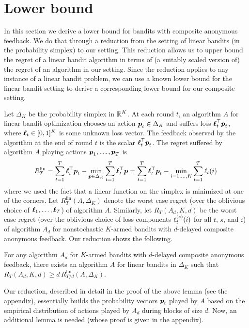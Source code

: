 \newcommand{\Rlin}{R^{\mathrm{lin}}}
\section{Lower bound}
\label{s:lower}
In this section we derive a lower bound for bandits with composite anonymous feedback. We do that through a reduction from the setting of linear bandits (in the probability simplex) to our setting. This reduction allows us to upper bound the regret of a linear bandit algorithm in terms of (a suitably scaled version of) the regret of an algorithm in our setting. Since the reduction applies to any instance of a linear bandit problem, we can use a known lower bound for the linear bandit setting to derive a corresponding lower bound for our composite setting.

Let $\Delta_K$ be the probability simplex in $\mathbb{R}^K$. At each round $t$, an algorithm $A$ for linear bandit optimization chooses an action $\boldsymbol{p}_t\in\Delta_K$ and suffers loss $\boldsymbol{\ell}_t^{\top}\boldsymbol{p}_t$, where $\boldsymbol{\ell}_t \in [0,1]^K$ is some unknown loss vector. The feedback observed by the algorithm at the end of round $t$ is the scalar $\boldsymbol{\ell}_t^{\top}\boldsymbol{p}_t$. The regret suffered by algorithm $A$ playing actions $\boldsymbol{p}_1,\dots,\boldsymbol{p}_T$ is
\begin{equation}
\label{eq:lin-regret}
	\Rlin_T = \sum_{t=1}^T \bloss_t^{\top}\bp_t - \min_{\bp\in\Delta_K} \sum_{t=1}^T \bloss_t^{\top}\bp = \sum_{t=1}^T \bloss_t^{\top}\bp_t - \min_{i=1,\dots,K} \sum_{t=1}^T \loss_t(i)
\end{equation}
where we used the fact that a linear function on the simplex is minimized at one of the corners.
Let $\Rlin_T(A,\Delta_K)$ denote the worst case regret (over the oblivious choice of $\boldsymbol{\ell}_1,\dots,\boldsymbol{\ell}_T$) of algorithm $A$. Similarly, let $R_T(A_d,K,d)$ be the worst case regret (over the oblivious choice of loss components $\ell_t^{(s)}(i)$ for all $t$, $s$, and $i$) of algorithm $A_d$ for nonstochastic $K$-armed bandits with $d$-delayed composite anonymous feedback. Our reduction shows the following.
%
\begin{lemma}\label{lem:lower}
For any algorithm $A_d$ for $K$-armed bandits with $d$-delayed composite anonymous feedback, there exists an algorithm $A$ for linear bandits in $\Delta_K$ such that
$
	R_T(A_d,K,d) \ge d\,\Rlin_{T/d}(A,\Delta_K)
$.
\end{lemma}
%
%
Our reduction, described in detail in the proof of the above lemma (see the appendix), essentially builds the probability vectors $\boldsymbol{p}_t$ played by $A$ based on the empirical distribution of actions played by $A_d$ during blocks of size $d$. Now, an additional lemma is needed (whose proof is given in the appendix).
